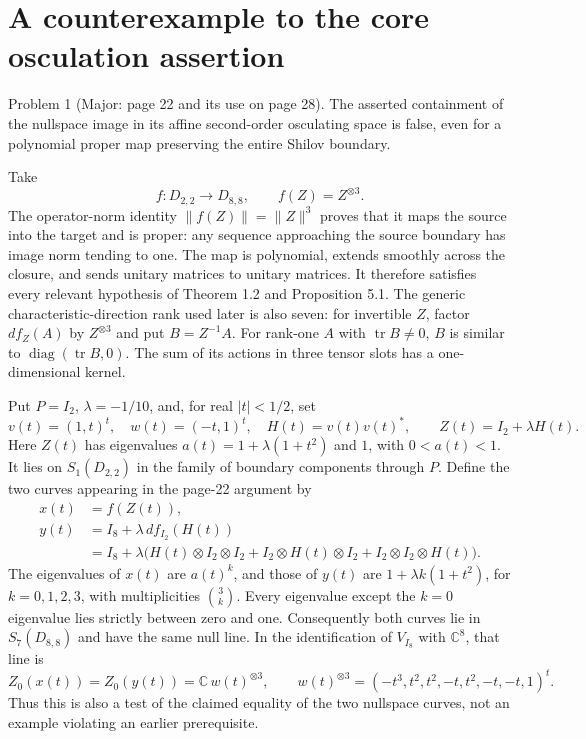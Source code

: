 \documentclass[10pt]{article}
\begin{document}
\section*{A counterexample to the core osculation assertion}
Problem 1 (Major: page 22 and its use on page 28).  The asserted containment of the nullspace image in its affine second-order osculating space is false, even for a polynomial proper map preserving the entire Shilov boundary.\par
Take \[f:D_{2,2}\longrightarrow D_{8,8},\qquad f(Z)=Z^{\otimes3}.
 \tag{1}\] The operator-norm identity \(\|f(Z)\|=\|Z\|^3\) proves that it maps the source into the target and is proper: any sequence approaching the source boundary has image norm tending to one. The map is polynomial, extends smoothly across the closure, and sends unitary matrices to unitary matrices. It therefore satisfies every relevant hypothesis of Theorem 1.2 and Proposition 5.1. The generic characteristic-direction rank used later is also seven: for invertible \(Z\), factor \(df_Z(A)\) by \(Z^{\otimes3}\) and put \(B=Z^{-1}A\). For rank-one \(A\) with \(\operatorname{tr}B\ne0\), \(B\) is similar to \(\operatorname{diag}(\operatorname{tr}B,0)\). The sum of its actions in three tensor slots has a one-dimensional kernel.\par
Put \(P=I_2\), \(\lambda=-1/10\), and, for real \(|t|<1/2\), set \[v(t)=(1,t)^t,\quad w(t)=(-t,1)^t,\quad H(t)=v(t)v(t)^*,
 \qquad Z(t)=I_2+\lambda H(t).\] Here \(Z(t)\) has eigenvalues \(a(t)=1+\lambda(1+t^2)\) and \(1\), with \(0<a(t)<1\). It lies on \(S_1(D_{2,2})\) in the family of boundary components through \(P\). Define the two curves appearing in the page-22 argument by \[\begin{split}
 x(t)&=f(Z(t)),\\
 y(t)&=I_8+\lambda\,df_{I_2}(H(t))\\
 &=I_8+\lambda\bigl(H(t)\otimes I_2\otimes I_2+
 I_2\otimes H(t)\otimes I_2+I_2\otimes I_2\otimes H(t)\bigr).
 \end{split} \tag{2}\] The eigenvalues of \(x(t)\) are \(a(t)^k\), and those of \(y(t)\) are \(1+\lambda k(1+t^2)\), for \(k=0,1,2,3\), with multiplicities \(\binom3k\). Every eigenvalue except the \(k=0\) eigenvalue lies strictly between zero and one. Consequently both curves lie in \(S_7(D_{8,8})\) and have the same null line. In the identification of \(V_{I_8}\) with \(\mathbb C^8\), that line is \[Z_0(x(t))=Z_0(y(t))
 =\mathbb C\,w(t)^{\otimes3},\qquad
 w(t)^{\otimes3}
 =(-t^3,t^2,t^2,-t,t^2,-t,-t,1)^t.
 \tag{3}\] Thus this is also a test of the claimed equality of the two nullspace curves, not an example violating an earlier prerequisite.\par
\end{document}

